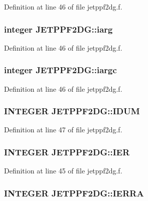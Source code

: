 Definition at line 46 of file jetppf2dg.f.\hypertarget{namespaceJETPPF2DG_ffda3e553d7afe1dc1f1b0b919addad8}{
\subsubsection[iarg]{\setlength{\rightskip}{0pt plus 5cm}integer {\bf JETPPF2DG::iarg}}}
\label{namespaceJETPPF2DG_ffda3e553d7afe1dc1f1b0b919addad8}




Definition at line 46 of file jetppf2dg.f.\hypertarget{namespaceJETPPF2DG_d26188761e21fc3625e8c5ed7d44695c}{
\subsubsection[iargc]{\setlength{\rightskip}{0pt plus 5cm}integer {\bf JETPPF2DG::iargc}}}
\label{namespaceJETPPF2DG_d26188761e21fc3625e8c5ed7d44695c}




Definition at line 46 of file jetppf2dg.f.\hypertarget{namespaceJETPPF2DG_525296fd37a70f64b96687ac65d85e15}{
\subsubsection[IDUM]{\setlength{\rightskip}{0pt plus 5cm}INTEGER {\bf JETPPF2DG::IDUM}}}
\label{namespaceJETPPF2DG_525296fd37a70f64b96687ac65d85e15}




Definition at line 47 of file jetppf2dg.f.\hypertarget{namespaceJETPPF2DG_bc3d3903b29c339401d382d43fd4ecc5}{
\subsubsection[IER]{\setlength{\rightskip}{0pt plus 5cm}INTEGER {\bf JETPPF2DG::IER}}}
\label{namespaceJETPPF2DG_bc3d3903b29c339401d382d43fd4ecc5}




Definition at line 45 of file jetppf2dg.f.\hypertarget{namespaceJETPPF2DG_47bfacdba737dd1c1fb6e676e5d5ace9}{
\subsubsection[IERRA]{\setlength{\rightskip}{0pt plus 5cm}INTEGER {\bf JETPPF2DG::IERRA}}}
\label{namespaceJETPPF2DG_47bfacdba737dd1c1fb6e676e5d5ace9}




